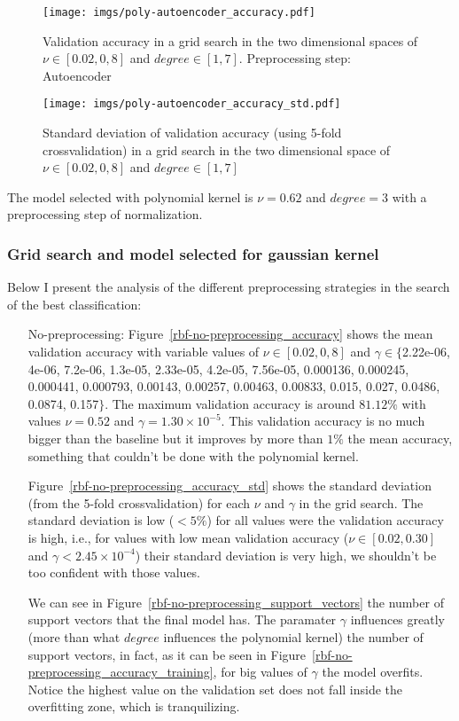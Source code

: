 \documentclass[format=acmtog]{acmart}
\begin{document}
\begin{figure}
\centering
\texttt{[image: imgs/poly-autoencoder\_accuracy.pdf]}
\caption{Validation accuracy in a grid search in the two dimensional
spaces of \(\nu \in [0.02,0,8]\) and \(degree \in [1,7]\). Preprocessing
step: Autoencoder \label{poly-autoencoder_accuracy}}
\end{figure}

\begin{figure}
\centering
\texttt{[image: imgs/poly-autoencoder\_accuracy\_std.pdf]}
\caption{Standard deviation of validation accuracy (using 5-fold
crossvalidation) in a grid search in the two dimensional space of
\(\nu \in [0.02,0,8]\) and \(degree \in [1,7]\)
\label{poly-autoencoder_accuracy_std}}
\end{figure}

The model selected with polynomial kernel is \(\nu = 0.62\) and
\(degree = 3\) with a preprocessing step of normalization.

\subsubsection{Grid search and model selected for gaussian
kernel}\label{grid-search-and-model-selected-for-gaussian-kernel}

Below I present the analysis of the different preprocessing strategies
in the search of the best classification:

\begin{itemize}
  \item[No-preprocessing:] Figure~\ref{rbf-no-preprocessing_accuracy} shows the mean
  validation accuracy with variable values of $\nu \in [0.02,0,8]$ and $\gamma \in
  \{$2.22e-06, 4e-06, 7.2e-06, 1.3e-05, 2.33e-05, 4.2e-05, 7.56e-05, 0.000136, 0.000245,
  0.000441, 0.000793, 0.00143, 0.00257, 0.00463, 0.00833, 0.015, 0.027, 0.0486, 0.0874,
  0.157$\}$. The maximum validation accuracy is around $81.12\%$ with values $\nu = 0.52$ and
  $\gamma = 1.30 \times 10^{-5}$. This validation accuracy is no much bigger than the
  baseline but it improves by more than $1\%$ the mean accuracy, something that couldn't
  be done with the polynomial kernel.

  Figure~\ref{rbf-no-preprocessing_accuracy_std} shows the standard deviation (from the
  5-fold crossvalidation) for each $\nu$ and $\gamma$ in the grid search. The standard
  deviation is low ($<5\%$) for all values were the validation accuracy is high, i.e., for
  values with low mean validation accuracy ($\nu \in [0.02,0.30]$ and $\gamma < 2.45 \times 10^{-4}$)
  their standard deviation is very high, we shouldn't be too confident with those
  values.

  We can see in Figure~\ref{rbf-no-preprocessing_support_vectors} the number of support
  vectors that the final model has. The paramater $\gamma$ influences greatly (more than
  what $degree$ influences the polynomial kernel) the number of support vectors, in fact,
  as it can be seen in Figure~\ref{rbf-no-preprocessing_accuracy_training}, for big values
  of $\gamma$ the model overfits. Notice the highest value on the validation set does not
  fall inside the overfitting zone, which is tranquilizing.
\end{itemize}
\end{document}
